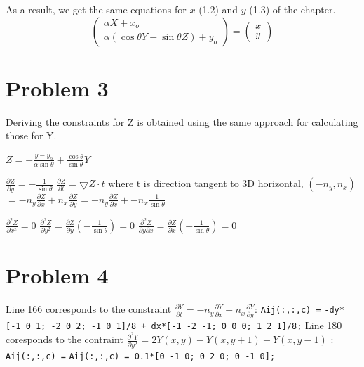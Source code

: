 \documentclass[12pt,twoside]{article}
\newcommand{\tabUnit}{3ex}
\newcommand{\tabT}{\hspace*{\tabUnit}}
\begin{document}
As a result, we get the same equations for $x$ (1.2) and $y$ (1.3) of the chapter.
$$
\begin{pmatrix}
\alpha X + x_o \\
\alpha( \cos{\theta}Y - \sin{\theta}Z ) + y_o
\end{pmatrix}
=
\begin{pmatrix}
x \\
y
\end{pmatrix}
$$

\section*{Problem 3}
\tabT Deriving the constraints for Z is obtained using the same approach for calculating those for Y.
\begin{center}
$Z = -\frac{y-y_o}{\alpha\sin{\theta}} + \frac{\cos{\theta}}{\sin{\theta}}Y$
\end{center}

$\frac{\partial Z}{\partial y} = -\frac{1}{\sin{\theta}}$ \newline
\tabT$\frac{\partial Z}{\partial t} = \bigtriangledown Z \cdot t$ where t is direction tangent to 3D horizontal, $(-n_y, n_x)$ \newline
\tabT\tabT $= -n_y\frac{\partial Z}{\partial x} + n_x\frac{\partial Z}{\partial y} = -n_y\frac{\partial Z}{\partial x} + -n_x\frac{1}{\sin{\theta}}$

$\frac{\partial^2 Z}{\partial x^x} = 0$ \newline
\tabT$\frac{\partial^2 Z}{\partial y^2} = \frac{\partial Z}{\partial y}(-\frac{1}{\sin{\theta}}) = 0$ \newline
\tabT$\frac{\partial^2 Z}{\partial y \partial x} = \frac{\partial Z}{\partial x}(-\frac{1}{\sin{\theta}}) = 0$ \newline

\section*{Problem 4}
\tabT Line 166 corresponds to the constraint $\frac{\partial Y}{\partial t} = -n_y\frac{\partial Y}{\partial x} + n_x\frac{\partial Y}{\partial y}$:\newline
\texttt{Aij(:,:,c) =} \newline 
\tabT\texttt{-dy*[-1 0 1; -2 0 2; -1 0 1]/8 + dx*[-1 -2 -1; 0 0 0; 1 2 1]/8;} \newline
\tabT Line 180 coresponds to the contraint $\frac{\partial^2 Y}{\partial y^2} = 2Y(x,y) - Y(x,y+1) - Y(x, y-1)$ :\newline
\texttt{Aij(:,:,c) =} \newline 
\tabT\texttt{Aij(:,:,c) = 0.1*[0 -1 0; 0 2 0; 0 -1 0];}
\end{document}
